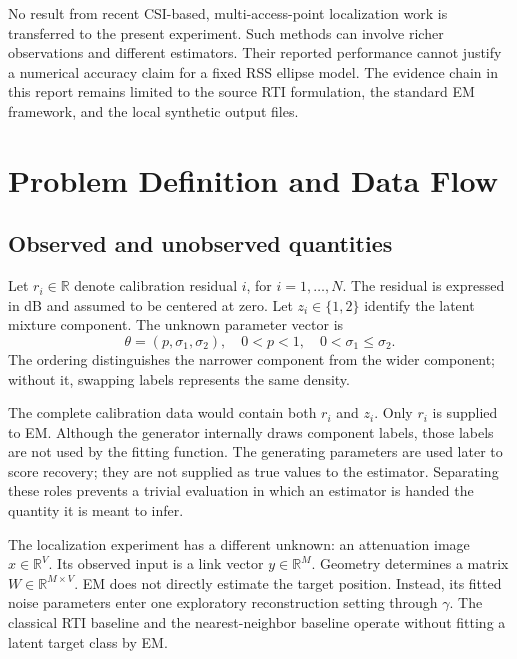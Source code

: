 \documentclass[conference,letterpaper]{IEEEtran}
\newcommand{\R}{\mathbb{R}}
\begin{document}
No result from recent CSI-based, multi-access-point localization work is transferred to the present experiment. Such methods can involve richer observations and different estimators. Their reported performance cannot justify a numerical accuracy claim for a fixed RSS ellipse model. The evidence chain in this report remains limited to the source RTI formulation, the standard EM framework, and the local synthetic output files.

\section{Problem Definition and Data Flow}
\subsection{Observed and unobserved quantities}
Let $r_i\in\R$ denote calibration residual $i$, for $i=1,\ldots,N$. The residual is expressed in dB and assumed to be centered at zero. Let $z_i\in\{1,2\}$ identify the latent mixture component. The unknown parameter vector is
\begin{equation}
\theta=(p,\sigma_1,\sigma_2),\quad 0<p<1,\quad 0<\sigma_1\leq\sigma_2.
\end{equation}
The ordering distinguishes the narrower component from the wider component; without it, swapping labels represents the same density.

The complete calibration data would contain both $r_i$ and $z_i$. Only $r_i$ is supplied to EM. Although the generator internally draws component labels, those labels are not used by the fitting function. The generating parameters are used later to score recovery; they are not supplied as true values to the estimator. Separating these roles prevents a trivial evaluation in which an estimator is handed the quantity it is meant to infer.

The localization experiment has a different unknown: an attenuation image $x\in\R^V$. Its observed input is a link vector $y\in\R^M$. Geometry determines a matrix $W\in\R^{M\times V}$. EM does not directly estimate the target position. Instead, its fitted noise parameters enter one exploratory reconstruction setting through $\gamma$. The classical RTI baseline and the nearest-neighbor baseline operate without fitting a latent target class by EM.
\end{document}
